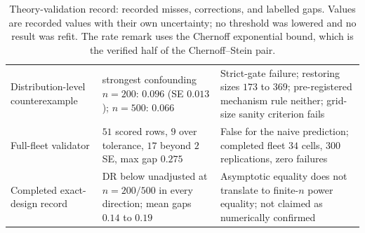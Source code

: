 \begin{table}[t]
\begin{tabularx}{\textwidth}{@{}>{\raggedright\arraybackslash}p{3.6cm}>{\raggedright\arraybackslash}p{5.2cm}>{\raggedright\arraybackslash}X@{}}
Distribution-level counterexample & strongest confounding $n=200$: $0.096$ (SE $0.013$); $n=500$: $0.066$ & Strict-gate failure; restoring sizes $173$ to $369$; pre-registered mechanism rule neither; grid-size sanity criterion fails \\
Full-fleet validator & $51$ scored rows, $9$ over tolerance, $17$ beyond $2$ SE, max gap $0.275$ & False for the naive prediction; completed fleet $34$ cells, $300$ replications, zero failures \\
Completed exact-design record & DR below unadjusted at $n=200/500$ in every direction; mean gaps $0.14$ to $0.19$ & Asymptotic equality does not translate to finite-$n$ power equality; not claimed as numerically confirmed \\
\hline
\end{tabularx}
\caption{Theory-validation record: recorded misses, corrections, and labelled gaps. Values are recorded values with their own uncertainty; no threshold was lowered and no result was refit. \footnotesize The rate remark uses the Chernoff exponential bound, which is the verified half of the Chernoff--Stein pair.}
\label{tab:validation}
\end{table}
